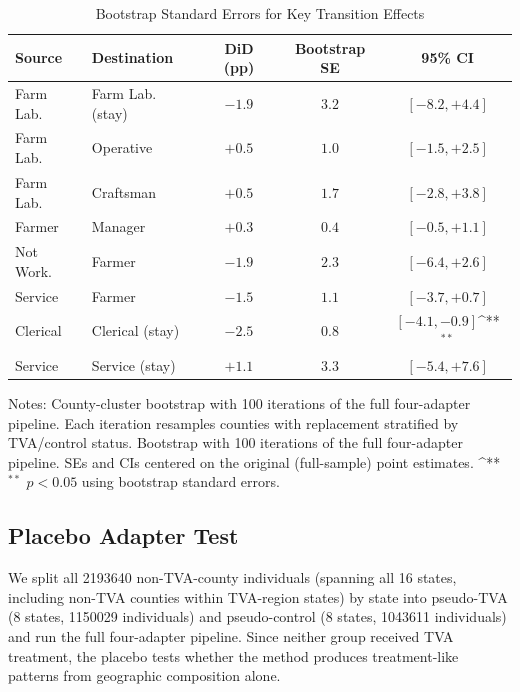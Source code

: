 \documentclass[12pt]{article}
\newcommand{\sym}[1]{\ifmmode^{#1}\else\(^{#1}\)\fi}
\begin{document}
\begin{table}[H]
\centering
\caption{Bootstrap Standard Errors for Key Transition Effects}
\label{tab:bootstrap_ses}
\begin{threeparttable}
\begin{tabular}{llccc}
\toprule
Source & Destination & DiD (pp) & Bootstrap SE & 95\% CI \\
\midrule
Farm Lab. & Farm Lab. (stay) & $-1.9$ & $3.2$ & $[-8.2, +4.4]$ \\
Farm Lab. & Operative & $+0.5$ & $1.0$ & $[-1.5, +2.5]$ \\
Farm Lab. & Craftsman & $+0.5$ & $1.7$ & $[-2.8, +3.8]$ \\
Farmer & Manager & $+0.3$ & $0.4$ & $[-0.5, +1.1]$ \\
Not Work. & Farmer & $-1.9$ & $2.3$ & $[-6.4, +2.6]$ \\
Service & Farmer & $-1.5$ & $1.1$ & $[-3.7, +0.7]$ \\
Clerical & Clerical (stay) & $-2.5$ & $0.8$ & $[-4.1, -0.9]$\sym{**} \\
Service & Service (stay) & $+1.1$ & $3.3$ & $[-5.4, +7.6]$ \\
\bottomrule
\end{tabular}
\begin{tablenotes}[flushleft]
\small
\item Notes: County-cluster bootstrap with 100 iterations of the full four-adapter pipeline. Each iteration resamples counties with replacement stratified by TVA/control status. Bootstrap with 100 iterations of the full four-adapter pipeline. SEs and CIs centered on the original (full-sample) point estimates. \sym{**} $p < 0.05$ using bootstrap standard errors.
\end{tablenotes}
\end{threeparttable}
\end{table}

\subsection{Placebo Adapter Test}

We split all \num{2193640} non-TVA-county individuals (spanning all 16 states, including non-TVA counties within TVA-region states) by state into pseudo-TVA (8 states, \num{1150029} individuals) and pseudo-control (8 states, \num{1043611} individuals) and run the full four-adapter pipeline. Since neither group received TVA treatment, the placebo tests whether the method produces treatment-like patterns from geographic composition alone.
\end{document}
